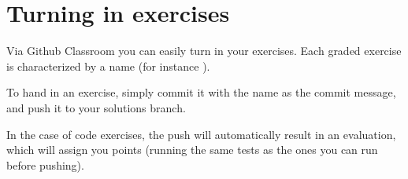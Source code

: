 
\section{Turning in exercises}\label{sec:handin_instructions}
Via Github Classroom you can easily turn in your exercises.
Each graded exercise is characterized by a name (for instance ).

To hand in an exercise, simply commit it with the name as the commit message, and push it to your solutions branch.

In the case of code exercises, the push will automatically result in an evaluation, which will assign you points (running the same tests as the ones you can run before pushing).


